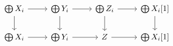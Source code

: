 \documentclass[12pt]{standalone}
\begin{document}
        $$

\begin{tikzcd}
    \bigoplus X_i \ar[r] \ar[d] & \bigoplus Y_i \ar[r] \ar[d] & \bigoplus Z_i \ar[r] \ar[d] &
     \bigoplus X_i[1] \ar[d] \\
    \bigoplus X_i \ar[r] & \bigoplus Y_i \ar[r] & Z \ar[r] & \bigoplus X_i[1]
\end{tikzcd}
        $$
        
\end{document}
